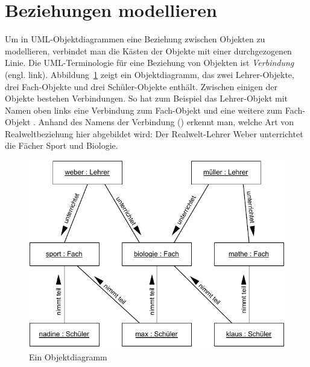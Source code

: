 \section{Beziehungen modellieren}
\label{sec:Kap-4.3}

Um in UML-Objektdiagrammen eine Beziehung zwischen Objekten zu modellieren, verbindet man die Kästen der Objekte mit einer durchgezogenen Linie. Die UML-Termi\-no\-logie für eine Beziehung von Objekten ist \textit{Verbindung} (engl. link).  Abbildung~\ref{fig:objektdiagramm} zeigt ein Objektdiagramm, das zwei Lehrer-Objekte, drei Fach-Objekte und drei Schüler-Objekte enthält. Zwischen einigen der Objekte bestehen Verbindungen. So hat zum Beispiel das Lehrer-Objekt mit Namen  oben links eine Verbindung zum Fach-Objekt  und eine weitere zum Fach-Objekt . Anhand des Namens der Verbindung () erkennt man, welche Art von Realweltbeziehung hier abgebildet wird: Der Realwelt-Lehrer Weber unterrichtet die Fächer Sport und Biologie. 

\vspace{\baselineskip} %

\begin{figure}[h!]
	\centering
	\includegraphics{Bilder/Kapitel-4/objektdiagramm_lehrer_fach_schueler.pdf}
	\caption{Ein Objektdiagramm}
	\label{fig:objektdiagramm}
\end{figure}

\vspace{\baselineskip} %

